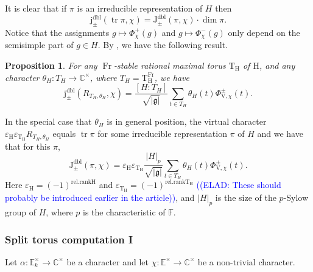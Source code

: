 \documentclass[12pt, reqno]{amsart}
\newtheorem{proposition}[theorem]{Proposition}
\theoremstyle{definition}
\theoremstyle{definition}
\theoremstyle{definition}
\newcommand{\cComplex}{\mathbb{C}}
\newcommand{\multiplicativegroup}[1]{#1^{\times}}
\newcommand{\sizeof}[1]{\left|#1\right|}
\newcommand{\hermitianSpace}{\mathrm{V}}
\newcommand{\grpIndex}[2]{\left[#1:#2\right]}
\newcommand{\trace}{\operatorname{tr}}
\newcommand{\finiteField}{\mathbb{F}}
\newcommand{\quadraticExtension}{\mathbb{E}}
\newcommand{\quadraticFieldExtension}[1]{\quadraticExtension_{#1}}
\newcommand{\Frobenius}{\operatorname{Fr}}
\newcommand{\posJacobiKernel}[1]{\Phi^{+}_{#1}}
\newcommand{\negJacobiKernel}[1]{\Phi^{-}_{#1}}
\newcommand{\genHermitianJacobiKernel}[2]{\Phi^{\pm}_{#1,#2}}
\newcommand{\dblJacobiSumScalar}[2]{\mathrm{J}_{\pm}^{\mathrm{dbl}}\left(#1, #2\right)}
\newcommand{\dblVirtualJacobiSumScalar}[2]{\mathrm{j}_{\pm}^{\mathrm{dbl}}\left(#1, #2\right)}
\newcommand{\lieAlgebra}{\mathfrak{g}}
\newcommand{\algebraicGroup}[1]{\boldsymbol{\mathrm{#1}}}
\newcommand{\RTTheta}[2]{R_{#1, #2}}
\newcommand{\elad}[1]{\textcolor{blue}{\sffamily ((ELAD: #1))}}
\begin{document}
It is clear that if $\pi$ is an irreducible representation of $H$ then $$\dblVirtualJacobiSumScalar{\trace \pi}{\chi} = \dblJacobiSumScalar{\pi}{\chi} \cdot \dim \pi.$$
Notice that the assignments $g \mapsto \posJacobiKernel{\chi}\left(g\right)$ and $g \mapsto \negJacobiKernel{\chi}\left(g\right)$ only depend on the semisimple part of $g \in H$. By , we have the following result.
\begin{proposition}\label{prop:reduction-of-gauss-sum-to-torus}
	For any $\Frobenius$-stable rational maximal torus $\algebraicGroup{T}_{\algebraicGroup{H}}$ of $\algebraicGroup{H}$, and any character $\theta_{H} \colon T_{H} \to \multiplicativegroup{\cComplex}$, where $T_H = \algebraicGroup{T}_{\algebraicGroup{H}}^{\Frobenius}$, we have
	$$ \dblVirtualJacobiSumScalar{\RTTheta{T_H}{\theta_H}}{\chi} = \frac{\grpIndex{H}{T_H}}{\sqrt{\sizeof{\lieAlgebra}}} \sum_{t \in T_H} \theta_H\left(t\right) \genHermitianJacobiKernel{\hermitianSpace}{\chi}\left(t\right).$$
\end{proposition}
In the special case that $\theta_H$ is in general position, the virtual character $\varepsilon_{\algebraicGroup{H}} \varepsilon_{\algebraicGroup{T}_{\algebraicGroup{H}}} \RTTheta{T_H}{\theta_H}$ equals $\trace \pi$ for some irreducible representation $\pi$ of $H$ and we have that for this $\pi$,
$$\dblJacobiSumScalar{\pi}{\chi} = \varepsilon_{\algebraicGroup{H}} \varepsilon_{\algebraicGroup{T}_{\algebraicGroup{H}}} \frac{\sizeof{H}_p}{\sqrt{\sizeof{\lieAlgebra}}} \sum_{t \in T_H} \theta_H\left(t\right) \genHermitianJacobiKernel{\hermitianSpace}{\chi}\left(t\right).$$
Here $\varepsilon_{\algebraicGroup{H}} = \left(-1\right)^{\mathrm{rel.rank} \algebraicGroup{H}}$ and $\varepsilon_{\algebraicGroup{T}_{\algebraicGroup{H}}} = \left(-1\right)^{\mathrm{rel.rank} \algebraicGroup{T}_{\algebraicGroup{H}}}$ \elad{These should probably be introduced earlier in the article}, and $\sizeof{H}_p$ is the size of the $p$-Sylow group of $H$, where $p$ is the characteristic of $\finiteField$. 

\subsubsection{Split torus computation I}
Let $\alpha \colon \multiplicativegroup{\quadraticFieldExtension{k}} \to \multiplicativegroup{\cComplex}$ be a character and let $\chi \colon \multiplicativegroup{\quadraticExtension} \to \multiplicativegroup{\cComplex}$ be a non-trivial character.
\end{document}
